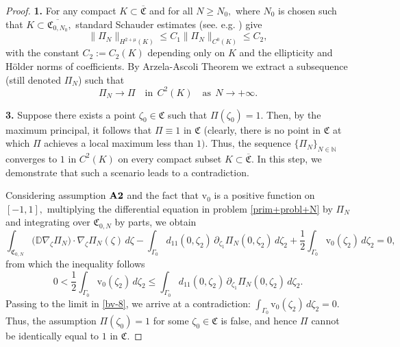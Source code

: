 \documentclass[reqno]{amsart}            %
\numberwithin{equation}{section}
\begin{document}
\begin{proof}{\bf 1.}
		For any compact $K \subset \overline{\mathfrak{C}}$ and for all $N \ge N_0,$ where $N_0$ is chosen such that $K \subset \overline{\mathfrak{C}_{0, N_0}},$ standard Schauder estimates (see. e.g. \cite{Lad_Ura_1968}) give
		\begin{equation}\label{uniform-bound}
			\|\Pi_N\|_{H^{2+\mu}(K)} \le C_1 \|\Pi_N\|_{C^0(K)} \le C_2,
		\end{equation}
		with the constant $C_2 := C_2(K)$  depending only on $K$ and the ellipticity and H\"older norms of coefficients. By Arzela-Ascoli Theorem we extract a subsequence (still denoted $\Pi_N$) such that 
		\begin{equation}\label{uniform-conv}
			\Pi_N  \to \Pi \quad\text{in} \ \ C^{2}(K) \quad \text{as} \ \ N \to +\infty.
		\end{equation}
		
		
		
		\smallskip
		
		{\bf 3.} Suppose there exists a point $\zeta_0 \in \mathfrak{C}$ such that $\Pi(\zeta_0)=1.$ Then, by the maximum principal, it follows that $\Pi \equiv 1$ in $\mathfrak{C}$ (clearly, there is no point in $\mathfrak{C}$ at which $\Pi$ achieves a local maximum less than $1).$
		Thus, the sequence $\{\Pi_N\}_{N\in \mathbb{N}}$ converges to $1$ in $C^{2}(K)$ on every  compact subset $ K \subset \overline{\mathfrak{C}} .$    In this step, we demonstrate that such a scenario leads to a contradiction.
		
		Considering   assumption ${\bf A2}$ and the fact that  $\mathrm{v}_0$ is a positive function on $ [-1, 1],$
		multiplying the differential equation in problem \eqref{prim+probl+N} by $\Pi_N$ and integrating over $\mathfrak{C}_{0,N}$ by parts,
		we obtain
		$$
		\int_{\mathfrak{C}_{0,N}}\big(\mathbb{D} \nabla_{\zeta}\Pi_N\big) \cdot \nabla_{\zeta}\Pi_N(\zeta)\, d\zeta - \int_{\Gamma_0}d_{11}(0,\zeta_2) \, \partial_{\zeta_1}\Pi_N(0,\zeta_2)\, d\zeta_2 + \frac12\int_{\Gamma_0} \mathrm{v}_0(\zeta_2)\, d\zeta_2 =0,
		$$	
		from which the inequality follows
		\begin{equation}\label{bv-8}
			0 < \frac12\int_{\Gamma_0} \mathrm{v}_0(\zeta_2)\, d\zeta_2  \le \int_{\Gamma_0}d_{11}(0,\zeta_2) \, \partial_{\zeta_1}\Pi_N(0,\zeta_2)\, d\zeta_2.	
		\end{equation}
		Passing to the limit in \eqref{bv-8}, we arrive at a contradiction: $\int_{\Gamma_0} \mathrm{v}_0(\zeta_2)\, d\zeta_2 =0.$ Thus, the assumption $\Pi (\zeta _0)=1$ for some $\zeta_0\in \mathfrak{C}$ is false, and hence $\Pi$  cannot be identically equal to $1$ in $\mathfrak{C}.$
		

\end{proof}
\end{document}
